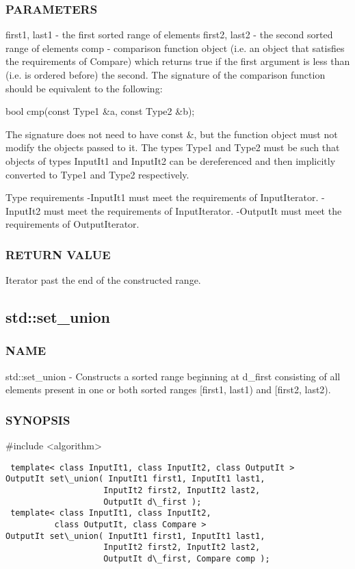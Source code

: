 \subsubsection{PARAMETERS}
first1, last1 - the first sorted range of elements
first2, last2 - the second sorted range of elements
comp - comparison function object (i.e. an object that satisfies the requirements of Compare) which returns true if the first argument is less than (i.e. is ordered before) the second.
The signature of the comparison function should be equivalent to the following:

 bool cmp(const Type1 \&a, const Type2 \&b);

The signature does not need to have const \&, but the function object must not modify the objects passed to it.
The types Type1 and Type2 must be such that objects of types InputIt1 and InputIt2 can be dereferenced and then implicitly converted to Type1 and Type2 respectively.

 Type requirements
 -InputIt1 must meet the requirements of InputIterator.
 -InputIt2 must meet the requirements of InputIterator.
 -OutputIt must meet the requirements of OutputIterator.

\subsubsection{RETURN VALUE}
Iterator past the end of the constructed range.



\subsection{std::set\_union}

\subsubsection{NAME}
std::set\_union - Constructs a sorted range beginning at d\_first consisting of all elements present in one or both sorted ranges [first1, last1) and [first2, last2).

\subsubsection{SYNOPSIS}
\#include <algorithm>

\begin{lstlisting}
 template< class InputIt1, class InputIt2, class OutputIt >
OutputIt set\_union( InputIt1 first1, InputIt1 last1,
                    InputIt2 first2, InputIt2 last2,
                    OutputIt d\_first );
 template< class InputIt1, class InputIt2,
          class OutputIt, class Compare >
OutputIt set\_union( InputIt1 first1, InputIt1 last1,
                    InputIt2 first2, InputIt2 last2,
                    OutputIt d\_first, Compare comp );
\end{lstlisting}

